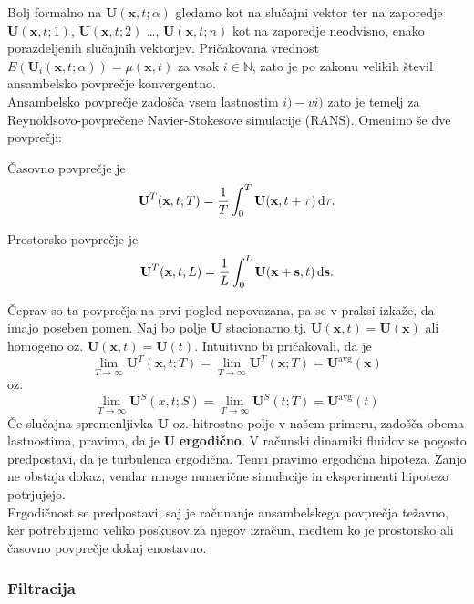 \documentclass[mat2, tisk]{fmfdelo}
\newcommand{\N}{\mathbb N}
\newcommand{\bd}{\textbf}
\begin{document}
Bolj formalno na $\bd{U}(\bd{x}, t;\alpha)$ gledamo kot na slučajni vektor ter na zaporedje 
$\bd{U}(\bd{x}, t; 1)$, $\bd{U}(\bd{x}, t; 2)$ \dots, $\bd{U}(\bd{x}, t;n)$ kot na zaporedje neodvisno, enako porazdeljenih 
slučajnih vektorjev. Pričakovana vrednost $E(\bd{U}_i(\bd{x}, t; \alpha)) = \mu(\bd{x}, t)$ za vsak $i\in\N$, zato je po 
zakonu velikih števil ansambelsko povprečje konvergentno.\\

Ansambelsko povprečje zadošča vsem lastnostim $i) - vi)$ zato je temelj za \\
Reynoldsovo-povprečene Navier-Stokesove simulacije (RANS). Omenimo še dve povprečji: 
\begin{definicija}
Časovno povprečje je 
\begin{equation}
\bd{U}^T(\bd{x}, t; T) = \frac{1}{T}\int_0^T \bd{U}(\bd{x}, t + \tau) \dif \tau.
\end{equation}
\end{definicija}

\begin{definicija}
Prostorsko povprečje je 
\begin{equation}
\bd{U}^T(\bd{x}, t; L) = \frac{1}{L}\int_0^L \bd{U}(\bd{x} + \bd{s}, t) \dif \bd{s}.
\end{equation}
\end{definicija}

Čeprav so ta povprečja na prvi pogled nepovazana, pa se v praksi izkaže, da imajo poseben 
pomen. Naj bo polje $\bd{U}$ stacionarno tj. $\bd{U}(\bd{x}, t) = \bd{U}(\bd{x})$ ali homogeno oz. $\bd{U}(\bd{x}, t) = \bd{U}(t)$.
Intuitivno bi pričakovali, da je 
$$
\lim_{T\rightarrow \infty} \bd{U}^T(\bd{x}, t; T) = \lim_{T\rightarrow \infty} \bd{U}^T(\bd{x}; T) = \bd{U}^\text{avg}(\bd{x})
$$
oz. 
$$
\lim_{T\rightarrow \infty} \bd{U}^S(x, t; S) = \lim_{T\rightarrow \infty} \bd{U}^S(t; T) = \bd{U}^\text{avg}(t)
$$
Če slučajna spremenljivka $\bd{U}$ oz. hitrostno polje v našem primeru, zadošča obema lastnostima, 
pravimo, da je $\bd{U}$ \textbf{ergodično}. V računski dinamiki fluidov se pogosto predpostavi, da je turbulenca ergodična. 
Temu pravimo ergodična hipoteza. Zanjo ne obstaja dokaz, vendar mnoge numerične simulacije in eksperimenti hipotezo potrjujejo. \\
Ergodičnost se predpostavi, saj je računanje ansambelskega povprečja težavno, ker potrebujemo 
veliko poskusov za njegov izračun, medtem ko je prostorsko ali časovno povprečje dokaj 
enostavno.

\subsubsection{Filtracija}
\end{document}
